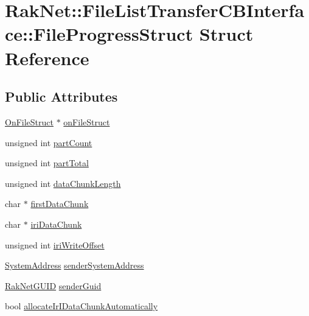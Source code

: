\hypertarget{struct_rak_net_1_1_file_list_transfer_c_b_interface_1_1_file_progress_struct}{\section{Rak\-Net\-:\-:File\-List\-Transfer\-C\-B\-Interface\-:\-:File\-Progress\-Struct Struct Reference}
\label{struct_rak_net_1_1_file_list_transfer_c_b_interface_1_1_file_progress_struct}
}
\subsection*{Public Attributes}
\begin{DoxyCompactItemize}
\item 
\hyperlink{struct_rak_net_1_1_file_list_transfer_c_b_interface_1_1_on_file_struct}{On\-File\-Struct} $\ast$ \hyperlink{struct_rak_net_1_1_file_list_transfer_c_b_interface_1_1_file_progress_struct_ad61495fa29afef7760d47326009afe80}{on\-File\-Struct}
\item 
unsigned int \hyperlink{struct_rak_net_1_1_file_list_transfer_c_b_interface_1_1_file_progress_struct_ae2fc4122e5a895c530c015882a41dcca}{part\-Count}
\item 
unsigned int \hyperlink{struct_rak_net_1_1_file_list_transfer_c_b_interface_1_1_file_progress_struct_abd81e27700d6b6b48cdc52a08890ce61}{part\-Total}
\item 
unsigned int \hyperlink{struct_rak_net_1_1_file_list_transfer_c_b_interface_1_1_file_progress_struct_ac7a15b6dfecf64a648b655577231f22b}{data\-Chunk\-Length}
\item 
char $\ast$ \hyperlink{struct_rak_net_1_1_file_list_transfer_c_b_interface_1_1_file_progress_struct_a46afac08532c8f81e142a124df87e39f}{first\-Data\-Chunk}
\item 
char $\ast$ \hyperlink{struct_rak_net_1_1_file_list_transfer_c_b_interface_1_1_file_progress_struct_ab113ec6be9d48acd86f889d316cca04f}{iri\-Data\-Chunk}
\item 
unsigned int \hyperlink{struct_rak_net_1_1_file_list_transfer_c_b_interface_1_1_file_progress_struct_a70be2afefa74cb197afc40cbdf33fc3b}{iri\-Write\-Offset}
\item 
\hyperlink{struct_rak_net_1_1_system_address}{System\-Address} \hyperlink{struct_rak_net_1_1_file_list_transfer_c_b_interface_1_1_file_progress_struct_a73043610499f536dc992e27b8de69908}{sender\-System\-Address}
\item 
\hyperlink{struct_rak_net_1_1_rak_net_g_u_i_d}{Rak\-Net\-G\-U\-I\-D} \hyperlink{struct_rak_net_1_1_file_list_transfer_c_b_interface_1_1_file_progress_struct_a4002294a3a3e615542976f8fece02a89}{sender\-Guid}
\item 
bool \hyperlink{struct_rak_net_1_1_file_list_transfer_c_b_interface_1_1_file_progress_struct_abb68fe1d7bc9fcf53d687ade569001e5}{allocate\-Ir\-I\-Data\-Chunk\-Automatically}
\end{DoxyCompactItemize}


